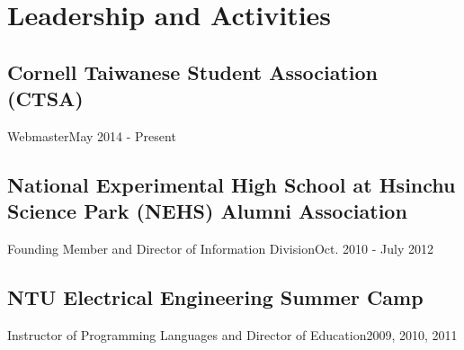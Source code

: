 \section{Leadership and Activities}
\subsection{Cornell Taiwanese Student Association (CTSA)}{Webmaster}{May 2014 - Present}
\subsection{National Experimental High School at Hsinchu Science Park (NEHS) Alumni Association}{Founding Member and Director of Information Division}{Oct. 2010 - July 2012}
\subsection{NTU Electrical Engineering Summer Camp}{Instructor of Programming Languages and Director of Education}{2009, 2010, 2011}